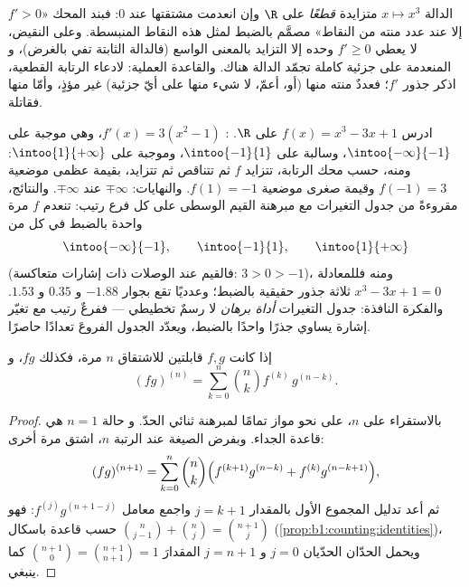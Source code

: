 \begin{example}\label{ex:b1:derivative:strictness}
الدالة $x \mapsto x^3$ متزايدة \emph{قطعًا} على $\R$ وإن
انعدمت مشتقتها عند $0$: فبند المحك
«$f' > 0$ إلا عند عدد منته من النقاط» مصمَّم بالضبط
لمثل هذه النقاط المنبسطة. وعلى النقيض، لا يعطي $f' \geq 0$ وحده إلا
التزايد بالمعنى الواسع (فالدالة الثابتة تفي بالغرض)، و
 المنعدمة على  جزئية كاملة تجمّد
الدالة هناك. والقاعدة العملية: لادعاء الرتابة القطعية،
اذكر جذور $f'$؛ فعددٌ منته منها (أو،  أعمّ، لا شيء
منها على أيّ  جزئية) غير مؤذٍ، وأمّا 
منها فقاتلة.
\end{example}

\begin{example}\label{ex:b1:derivative:variations}
ادرس $f(x) = x^3 - 3x + 1$ على $\R$. : $f'(x) =
3(x^2 - 1)$، وهي موجبة على $\intoo{-\infty}{-1}$، وسالبة على
$\intoo{-1}{1}$، وموجبة على $\intoo{1}{+\infty}$: ومنه، حسب
محك الرتابة، تتزايد $f$ ثم تتناقص ثم
تتزايد، بقيمة عظمى موضعية $f(-1) = 3$ وقيمة صغرى موضعية
$f(1) = -1$. والنهايات: $\mp\infty$ عند $\mp\infty$. والنتائج،
مقروءةً من جدول التغيرات مع مبرهنة القيم
الوسطى على كل فرع رتيب: تنعدم $f$ مرة واحدة بالضبط في
كل من
\[
\intoo{-\infty}{-1}, \qquad \intoo{-1}{1}, \qquad
\intoo{1}{+\infty}
\]
(فالقيم عند الوصلات ذات إشارات متعاكسة: $3 > 0 > -1$)،
ومنه فللمعادلة $x^3 - 3x + 1 = 0$ ثلاثة جذور حقيقية
بالضبط؛ وعدديًا تقع بجوار $-1.88$ و $0.35$ و $1.53$. والفكرة
النافذة: جدول التغيرات \emph{أداة برهان}
لا رسمٌ تخطيطي --- ففرعٌ رتيب مع تغيّر إشارة يساوي
جذرًا واحدًا بالضبط، ويعدّد الجدول الفروعَ
تعدادًا حاصرًا.
\end{example}

\begin{theorem}\label{thm:b1:derivative:leibniz}
إذا كانت $f, g$ قابلتين للاشتقاق $n$ مرة، فكذلك $fg$،
و
\[
(fg)^{(n)} = \sum_{k=0}^{n} \binom nk f^{(k)}\, g^{(n-k)} .
\]
\end{theorem}

\begin{proof}
بالاستقراء على $n$، على نحو مواز تمامًا لمبرهنة ثنائي الحدّ. و
حالة $n = 1$ هي قاعدة الجداء. وبفرض الصيغة عند الرتبة
$n$، اشتق مرة أخرى:
\[
(fg)^{(n+1)} = \sum_{k=0}^{n} \binom nk
\Bigl( f^{(k+1)} g^{(n-k)} + f^{(k)} g^{(n-k+1)} \Bigr),
\]
ثم أعد تدليل المجموع الأول بالمقدار $j = k + 1$ واجمع
معامل $f^{(j)} g^{(n+1-j)}$: فهو $\binom{n}{j-1} +
\binom nj = \binom{n+1}{j}$ حسب قاعدة باسكال
(\cref{prop:b1:counting:identities})، ويحمل الحدّان الحدّيان $j = 0$
و $j = n + 1$ المقدارَ $\binom{n+1}{0} = \binom{n+1}{n+1} =
1$ كما ينبغي.
\end{proof}

